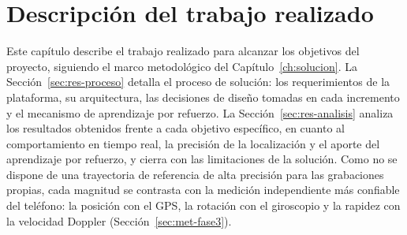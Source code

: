 
\chapter{Descripción del trabajo realizado}
\label{ch:resultados}

Este capítulo describe el trabajo realizado para alcanzar los objetivos del proyecto, siguiendo el marco metodológico del Capítulo~\ref{ch:solucion}.
La Sección~\ref{sec:res-proceso} detalla el proceso de solución: los requerimientos de la plataforma, su arquitectura, las decisiones de diseño tomadas en cada incremento y el mecanismo de aprendizaje por refuerzo.
La Sección~\ref{sec:res-analisis} analiza los resultados obtenidos frente a cada objetivo específico, en cuanto al comportamiento en tiempo real, la precisión de la localización y el aporte del aprendizaje por refuerzo, y cierra con las limitaciones de la solución.
Como no se dispone de una trayectoria de referencia de alta precisión para las grabaciones propias, cada magnitud se contrasta con la medición independiente más confiable del teléfono: la posición con el GPS, la rotación con el giroscopio y la rapidez con la velocidad Doppler (Sección~\ref{sec:met-fase3}).

